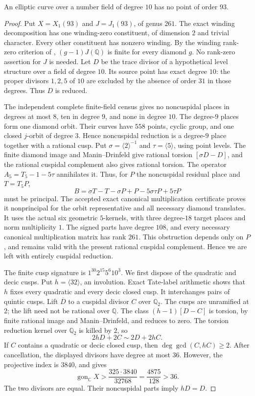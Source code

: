 \begin{proposition}\label{prop:decic-no93}
An elliptic curve over a number field of degree $10$ has no point
of order $93$.
\end{proposition}
\begin{proof}
Put $X=X_1(93)$ and $J=J_1(93)$, of genus $261$.
The exact winding decomposition has one winding-zero constituent,
of dimension $2$ and trivial character. Every other constituent has
nonzero winding. By the winding rank-zero criterion of \cite[Section~3]{DEHMZ},
$(g-1)J(\mathbb Q)$ is finite for
every diamond $g$. No rank-zero assertion for $J$ is needed.
Let $D$ be the trace divisor of a hypothetical level structure over
a field of degree $10$. Its source point has exact degree $10$:
the proper divisors $1,2,5$ of $10$ are excluded by the absence of
order $31$ in those degrees. Thus $D$ is reduced.

The independent complete finite-field census gives no noncuspidal
places in degrees at most $8$, ten in degree $9$, and none in degree
$10$. The degree-$9$ places form one diamond orbit. Their curves have
$558$ points, cyclic group, and one closed $j$-orbit of degree $3$.
Hence noncuspidal reduction is a degree-$9$ place together with a
rational cusp. Put $\sigma=\langle2\rangle^{-1}$ and
$\tau=\langle5\rangle$, using point levels.
The finite diamond image and Manin--Drinfeld give rational torsion
$[\sigma D-D]$, and the rational cuspidal complement also gives
rational torsion. The operator $A_5=T_5-1-5\tau$ annihilates it.
Thus, for $P$ the noncuspidal residual place and $T=T_5P$,
\[
 B=\sigma T-T-\sigma P+P-5\sigma\tau P+5\tau P
\]
must be principal. The accepted exact canonical multiplication
certificate proves it nonprincipal for the orbit representative and
all necessary diamond translates. It uses the actual six geometric
$5$-kernels, with three degree-$18$ target places and norm
multiplicity $1$. The signed parts have degree $108$, and every
necessary canonical multiplication matrix has rank $261$.
This obstruction depends only on $P$, and remains
valid with the present rational cuspidal complement. Hence we are
left with entirely cuspidal reduction.

The finite cusp signature is $1^{30}2^{15}5^6 10^3$.
We first dispose of the quadratic and decic cusps. Put
$h=\langle32\rangle$, an involution. Exact Tate-label arithmetic
shows that $h$ fixes every quadratic and every decic closed cusp.
It interchanges pairs of quintic cusps.
Lift $\overline D$ to a cuspidal divisor $C$ over $\mathbb Q_2$.
The cusps are unramified at $2$; the lift need not be rational over
$\mathbb Q$. The class $(h-1)[D-C]$ is torsion, by finite rational
image and Manin--Drinfeld, and reduces to zero. The torsion reduction
kernel over $\mathbb Q_2$ is killed by $2$, so
\[
 2hD+2C\sim2D+2hC.
\]
If $C$ contains a quadratic or decic closed cusp, then
$\deg\gcd(C,hC)\geq2$. After cancellation, the displayed divisors
have degree at most $36$. However, the projective index is $3840$,
and \cite[(2.1)]{NV} gives
\[
 \operatorname{gon}_{\mathbb C}X>
 \frac{325\cdot3840}{32768}=\frac{4875}{128}>36.
\]
The two divisors are equal. Their noncuspidal parts imply $hD=D$.


\end{proof}
